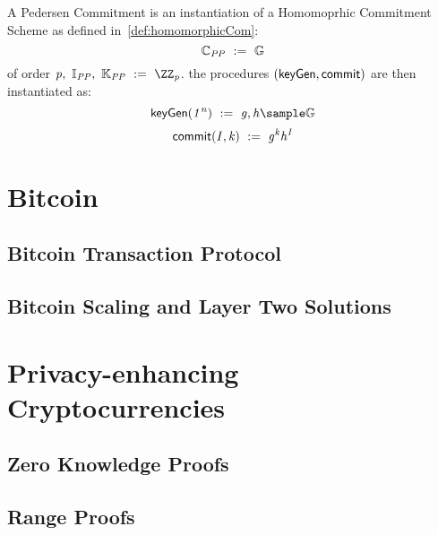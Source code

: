 \begin{definition}\label{def:pedersenCom}
    A Pedersen Commitment is an instantiation of a Homomoprhic Commitment Scheme as defined in~\ref{def:homomorphicCom}:
    \[ \mathbb{C}_{\mathit{PP}} ~:=~ \mathbb{G}\] of order $\varPrime \opSeperate \varInputSpace_{\varPublicParam} \opSeperate \varRandSpace_{\varPublicParam} \opAssign \cnstIntegersPrime{\varPrime}$.
    the procedures $(\mathsf{keyGen}, \mathsf{commit})$ are then instantiated as:
    \[ \procSetup{\varSecParam} \opAssign \varG, \varH \sample \cnstGroup\]
    \[ \mathsf{commit}(\mathit{I}, \mathit{k}) ~:=~ \mathit{g}^{\mathit{k}} \mathit{h}^{\mathit{I}} \]

\end{definition}


\section{Bitcoin}\label{sec:bitcoin}

\subsection{Bitcoin Transaction Protocol}\label{sec:bitcoinTx}



\subsection{Bitcoin Scaling and Layer Two Solutions}\label{sec:bitcoinScaling}


\section{Privacy-enhancing Cryptocurrencies}\label{sec:privacyCryptos}

\subsection{Zero Knowledge Proofs}\label{sec:zeroKnowlegde}

\subsection{Range Proofs}\label{sec:rangeProof}

